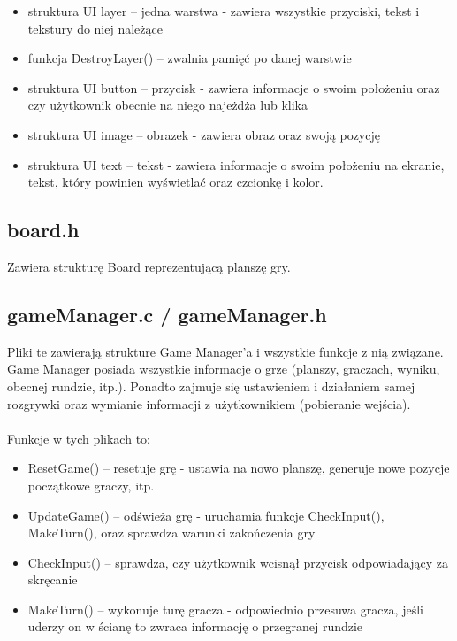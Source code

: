 \documentclass[11pt]{article}
\begin{document}
		\begin{itemize}
			\item struktura UI layer -- jedna warstwa - zawiera wszystkie przyciski, tekst i tekstury do niej należące
			\item funkcja DestroyLayer() -- zwalnia pamięć po danej warstwie
			\item struktura UI button -- przycisk - zawiera informacje o swoim położeniu oraz czy użytkownik obecnie na niego najeżdża lub klika
			\item struktura UI image -- obrazek - zawiera obraz oraz swoją pozycję
			\item struktura UI text -- tekst - zawiera informacje o swoim położeniu na ekranie, tekst, który powinien wyświetlać oraz czcionkę i kolor.
		\end{itemize}

		\subsection{board.h}
		\noindent Zawiera strukturę Board reprezentującą planszę gry.

		\subsection{gameManager.c / gameManager.h}
		\noindent Pliki te zawierają strukture Game Manager'a i wszystkie funkcje z nią związane. Game Manager posiada wszystkie informacje o grze (planszy, graczach, wyniku, obecnej rundzie, itp.). Ponadto zajmuje się ustawieniem i działaniem samej rozgrywki oraz wymianie informacji z użytkownikiem (pobieranie wejścia).
		\\
		\\
		\noindent Funkcje w tych plikach to: 

		\begin{itemize}
			\item ResetGame() -- resetuje grę - ustawia na nowo planszę, generuje nowe pozycje początkowe graczy, itp.
			\item UpdateGame() -- odświeża grę - uruchamia funkcje CheckInput(), MakeTurn(), oraz sprawdza warunki zakończenia gry
			\item CheckInput() -- sprawdza, czy użytkownik wcisnął przycisk odpowiadający za skręcanie
			\item MakeTurn() -- wykonuje turę gracza - odpowiednio przesuwa gracza, jeśli uderzy on w ścianę to zwraca informację o przegranej rundzie
		\end{itemize}
\end{document}

